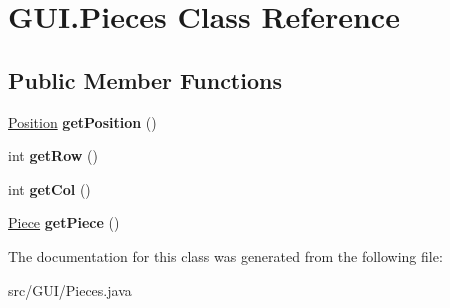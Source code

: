 \hypertarget{class_g_u_i_1_1_pieces}{}\section{G\+U\+I.\+Pieces Class Reference}
\label{class_g_u_i_1_1_pieces}
\subsection*{Public Member Functions}
\begin{DoxyCompactItemize}
\item 
\mbox{\label{class_g_u_i_1_1_pieces_a7a80a98817eb3695bbd9e263723061cd}} 
\hyperlink{classmain_1_1_position}{Position} {\bfseries get\+Position} ()
\item 
\mbox{\label{class_g_u_i_1_1_pieces_ad02fe389091abd68a3f57b3d86d474d7}} 
int {\bfseries get\+Row} ()
\item 
\mbox{\label{class_g_u_i_1_1_pieces_abe52623846dd823662a0ff4074c69efe}} 
int {\bfseries get\+Col} ()
\item 
\mbox{\label{class_g_u_i_1_1_pieces_a3e15e6e262b8f4cd33d7442f64c113ce}} 
\hyperlink{classmain_1_1_piece}{Piece} {\bfseries get\+Piece} ()
\end{DoxyCompactItemize}


The documentation for this class was generated from the following file\+:\begin{DoxyCompactItemize}
\item 
src/\+G\+U\+I/Pieces.\+java\end{DoxyCompactItemize}
